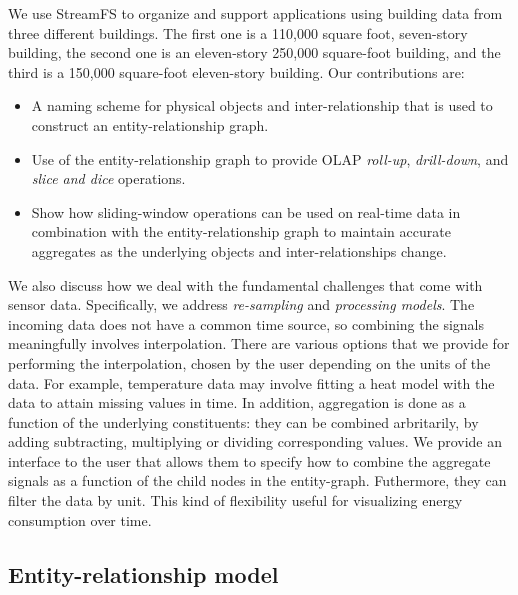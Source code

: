 We use StreamFS to organize and support applications using building data from three different
buildings.  The first one is a 110,000 square foot, seven-story building, the second one is an eleven-story
250,000 square-foot building, and the third is a 150,000 square-foot eleven-story building.
Our contributions are:

\begin{itemize}
\item A naming scheme for physical objects and inter-relationship that is used to construct
		an entity-relationship graph.
\item Use of the entity-relationship graph to provide OLAP \emph{roll-up}, \emph{drill-down},
		and \emph{slice and dice} operations.
\item Show how sliding-window operations can be used on real-time data in combination with the entity-relationship
		graph to maintain accurate aggregates as the underlying objects and inter-relationships change.
\end{itemize}

\vspace{0.08in}

We also discuss how we deal with the fundamental challenges that come with sensor data.  Specifically, we 
address \emph{re-sampling} and \emph{processing models}.  The incoming data does not have a common
time source, so combining the signals meaningfully involves interpolation.  There are various options that we
provide for performing the interpolation, chosen by the user depending on the units of the data.  For example,
temperature data may involve fitting a heat model with the data to attain missing values in time.  In addition,
aggregation is done as a function of the underlying constituents: they can be combined arbritarily, by adding
subtracting, multiplying or dividing corresponding values.  We provide an interface to the user that
allows them to specify how to combine the aggregate signals as a function of the child nodes in the entity-graph.
Futhermore, they can filter the data by unit.  This kind of flexibility useful for visualizing
energy consumption over time.
















\subsection{Entity-relationship model}

